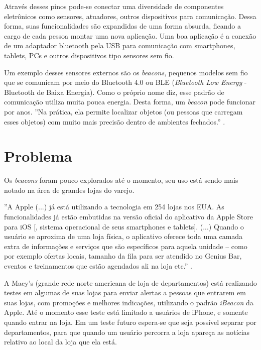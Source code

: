 \documentclass[
	12pt,				%
	openright,			%
	oneside,			%
	a4paper,			%
	chapter=TITLE,		%
	english,			%
	french,				%
	spanish,			%
	brazil				%
	]{abntex2}
\begin{document}
{Através desses pinos pode-se conectar uma diversidade de componentes eletrônicos como sensores, atuadores, outros dispositivos para comunicação. Dessa forma, suas funcionalidades são expandidas de uma forma absurda, ficando a cargo de cada pessoa montar uma nova aplicação. Uma boa aplicação é a conexão de um adaptador bluetooth pela USB para comunicação com smartphones, tablets, PCs e outros dispositivos tipo sensores sem fio.

Um exemplo desses sensores externos são os \textit{beacons}, pequenos modelos sem fio que se comunicam por meio do Bluetooth 4.0 ou BLE (\textit{Bluetooth Low Energy} - Bluetooth de Baixa Energia). Como o próprio nome diz, esse padrão de comunicação utiliza muita pouca energia. Desta forma, um \textit{beacon} pode funcionar por anos. ''Na prática, ela permite localizar objetos (ou pessoas que carregam esses objetos) com muito mais precisão dentro de ambientes fechados.'' \cite{teixeira-beacon}.


\chapter{Problema}

Os \textit{beacons} foram pouco explorados até o momento, seu uso está sendo mais notado na área de grandes lojas do varejo.

\begin{citacao}
''A Apple (...) já está utilizando a tecnologia em 254 lojas nos EUA. As funcionalidades já estão embutidas na versão oficial do aplicativo da Apple Store para iOS [, sistema operacional de seus smartphones e tablets]. (...) Quando o usuário se aproxima de uma loja física, o aplicativo oferece toda uma camada extra de informações e serviços que são específicos para aquela unidade – como por exemplo ofertas locais, tamanho da fila para ser atendido no Genius Bar, eventos e treinamentos que estão agendados ali na loja etc.'' \cite{teixeira-beacon}.
\end{citacao}

A Macy's (grande rede norte americana de loja de departamentos) está realizando testes em algumas de suas lojas para enviar alertas a pessoas que entrarem em suas lojas, com promoções e melhores indicações, utilizando o padrão \textit{iBeacon} da Apple. Até o momento esse teste está limitado a usuários de iPhone, e somente quando entrar na loja. Em um teste futuro espera-se que seja possível separar por departamentos, para que quando um usuário percorra a loja apareça as notícias relativo ao local da loja que ela está. \cite{kastrenakes-macys-beacon}

}
\end{document}
